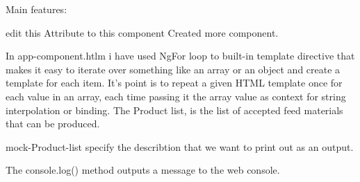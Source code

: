 Main features:

edit this Attribute to this component Created more component.

In app-component.htlm  i have used NgFor loop to built-in template directive that makes it easy to iterate over something like an array or an object and create a template for each item.
It's point is to repeat a given HTML template once for each value in an array, each time passing it the array value as context for string interpolation or binding.
The Product list, is the list of accepted feed materials
that can be produced.

mock-Product-list specify the describtion that we want to print out as an output.

The console.log() method outputs a message to the web console. 